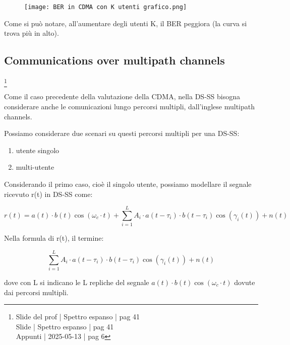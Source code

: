 \begin{figure}[h]
    \centering
    \texttt{[image: BER in CDMA con K utenti grafico.png]}
\end{figure}

Come si può notare, 
all'aumentare degli utenti K, 
il BER peggiora (la curva si trova più in alto). \newline 

\newpage

\subsection{Communications over multipath channels}
\footnote{Slide del prof | Spettro espanso | pag 41 \\
Slide | Spettro espanso | pag 41 \\
Appunti | 2025-05-13 | pag 6 
} 

Come il caso precedente della valutazione della CDMA, 
nella DS-SS bisogna considerare anche le comunicazioni lungo 
percorsi multipli, dall'inglese multipath channels. \newline 

Possiamo considerare due scenari su questi percorsi multipli per una DS-SS: 

\begin{enumerate}
    \item utente singolo 
    \item multi-utente
\end{enumerate}

Considerando il primo caso, 
cioè il singolo utente, 
possiamo modellare il segnale ricevuto r(t) in DS-SS come: 

{
    \Large 
    \begin{equation}
        r(t)
        = 
        a(t) \cdot b(t) \cos(\omega_c \cdot t)
        + 
        \sum_{i = 1}^{L}
        A_i 
        \cdot 
        a(t - \tau_i)
        \cdot 
        b(t - \tau_i)
        \cos(\gamma_i (t))
        + 
        n(t)
    \end{equation}
}

Nella formula di r(t), 
il termine: 

{
    \Large 
    \begin{equation}
        \sum_{i = 1}^{L}
        A_i 
        \cdot 
        a(t - \tau_i)
        \cdot 
        b(t - \tau_i)
        \cos(\gamma_i (t))
        + 
        n(t)
    \end{equation}
}

dove con L si indicano le L repliche del segnale $a(t) \cdot b(t) \cos(\omega_c \cdot t)$ 
dovute dai percorsi multipli. \newline 

